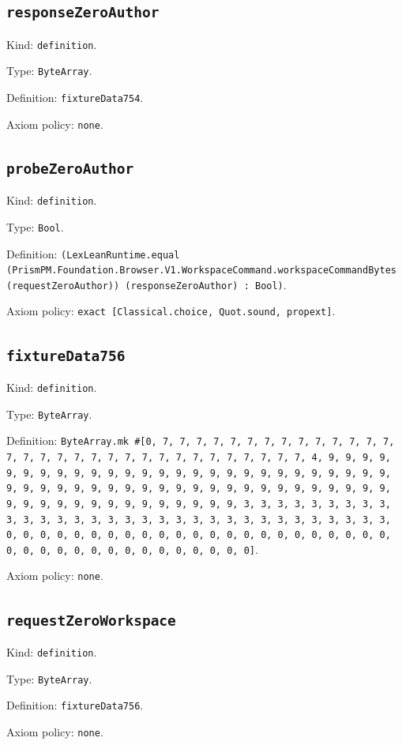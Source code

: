 \documentclass[11pt]{article}
\begin{document}
\subsection*{\texttt{responseZeroAuthor}}
\noindent Kind: \texttt{definition}.\par
\noindent Type: \texttt{ByteArray}.\par
\noindent Definition: \texttt{fixtureData754}.\par
\noindent Axiom policy: \texttt{none}.\par
\subsection*{\texttt{probeZeroAuthor}}
\noindent Kind: \texttt{definition}.\par
\noindent Type: \texttt{Bool}.\par
\noindent Definition: \texttt{(LexLeanRuntime.equal (PrismPM.Foundation.Browser.V1.WorkspaceCommand.workspaceCommandBytes (requestZeroAuthor)) (responseZeroAuthor) : Bool)}.\par
\noindent Axiom policy: \texttt{exact [Classical.choice, Quot.sound, propext]}.\par
\subsection*{\texttt{fixtureData756}}
\noindent Kind: \texttt{definition}.\par
\noindent Type: \texttt{ByteArray}.\par
\noindent Definition: \texttt{ByteArray.mk \#[0, 7, 7, 7, 7, 7, 7, 7, 7, 7, 7, 7, 7, 7, 7, 7, 7, 7, 7, 7, 7, 7, 7, 7, 7, 7, 7, 7, 7, 7, 7, 7, 7, 4, 9, 9, 9, 9, 9, 9, 9, 9, 9, 9, 9, 9, 9, 9, 9, 9, 9, 9, 9, 9, 9, 9, 9, 9, 9, 9, 9, 9, 9, 9, 9, 9, 9, 9, 9, 9, 9, 9, 9, 9, 9, 9, 9, 9, 9, 9, 9, 9, 9, 9, 9, 9, 9, 9, 9, 9, 9, 9, 9, 9, 9, 9, 9, 9, 3, 3, 3, 3, 3, 3, 3, 3, 3, 3, 3, 3, 3, 3, 3, 3, 3, 3, 3, 3, 3, 3, 3, 3, 3, 3, 3, 3, 3, 3, 3, 3, 0, 0, 0, 0, 0, 0, 0, 0, 0, 0, 0, 0, 0, 0, 0, 0, 0, 0, 0, 0, 0, 0, 0, 0, 0, 0, 0, 0, 0, 0, 0, 0, 0, 0, 0, 0, 0, 0]}.\par
\noindent Axiom policy: \texttt{none}.\par
\subsection*{\texttt{requestZeroWorkspace}}
\noindent Kind: \texttt{definition}.\par
\noindent Type: \texttt{ByteArray}.\par
\noindent Definition: \texttt{fixtureData756}.\par
\noindent Axiom policy: \texttt{none}.\par
\end{document}
